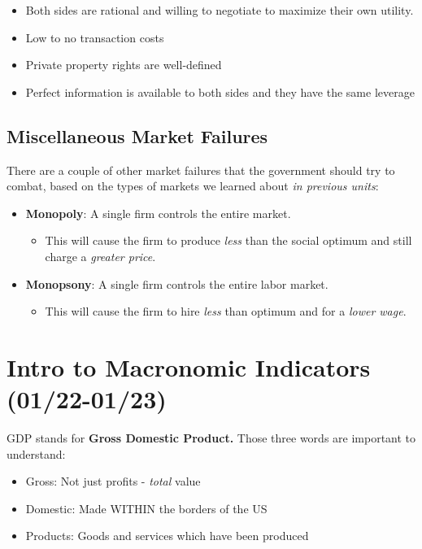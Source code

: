 \documentclass[
  letterpaper,
  DIV=11,
  numbers=noendperiod]{scrartcl}
\providecommand{\tightlist}{%
  \setlength{\itemsep}{0pt}\setlength{\parskip}{0pt}}\usepackage{longtable,booktabs,array}
\begin{document}
\begin{itemize}
\tightlist
\item
  Both sides are rational and willing to negotiate to maximize their own
  utility.
\item
  Low to no transaction costs
\item
  Private property rights are well-defined
\item
  Perfect information is available to both sides and they have the same
  leverage
\end{itemize}

\subsection{Miscellaneous Market
Failures}\label{miscellaneous-market-failures}

There are a couple of other market failures that the government should
try to combat, based on the types of markets we learned about \emph{in
previous units}:

\begin{itemize}
\tightlist
\item
  \textbf{Monopoly}: A single firm controls the entire market.

  \begin{itemize}
  \tightlist
  \item
    This will cause the firm to produce \emph{less} than the social
    optimum and still charge a \emph{greater price}.
  \end{itemize}
\item
  \textbf{Monopsony}: A single firm controls the entire labor market.

  \begin{itemize}
  \tightlist
  \item
    This will cause the firm to hire \emph{less} than optimum and for a
    \emph{lower wage}.
  \end{itemize}
\end{itemize}

\newpage{}

\section{Intro to Macronomic Indicators
(01/22-01/23)}\label{intro-to-macronomic-indicators-0122-0123}

GDP stands for \textbf{Gross Domestic Product.} Those three words are
important to understand:

\begin{itemize}
\tightlist
\item
  Gross: Not just profits - \emph{total} value
\item
  Domestic: Made WITHIN the borders of the US
\item
  Products: Goods and services which have been produced
\end{itemize}
\end{document}
